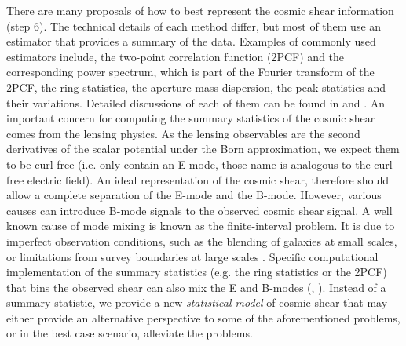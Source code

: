There are many proposals of how to best represent the cosmic shear information
(step 6). The technical details of each method differ, but most of them use
an estimator that provides a summary of the data.
Examples of commonly used estimators include, the two-point correlation function 
(2PCF) and the corresponding power spectrum, which is part of the Fourier transform of the 2PCF, 
the ring statistics, the aperture mass dispersion, the peak statistics and
their variations. Detailed discussions of each of them can be found in 
\cite{Kilbinger2015} and \cite{Bartelmann2001a}.
An important concern for computing the summary statistics of the cosmic shear 
comes from the lensing physics. As the lensing observables are the second derivatives of the
scalar potential under the Born approximation, we expect them to be curl-free
(i.e. only contain an E-mode, those name is analogous to the curl-free electric
field). An ideal representation of the
cosmic shear, therefore should allow a complete separation of the E-mode and the B-mode.
However, various causes can
introduce B-mode signals to the observed cosmic shear signal. A well known
cause of mode mixing is known as the finite-interval problem. It is due to
imperfect observation conditions, such as the blending of galaxies at small scales,
or limitations from survey boundaries at large scales \citep{Kilbinger2013}.  
Specific computational implementation of the summary statistics (e.g. the ring
statistics or the 2PCF) that bins the 
observed shear can also mix the E and B-modes (\citealt{Eifler2010},
\citealt{Becker2013}). Instead of a summary statistic, we provide a new 
{\it statistical model} of cosmic shear that may either provide an alternative
perspective to some of the aforementioned problems, or in the best case
scenario, alleviate the problems. 
 
